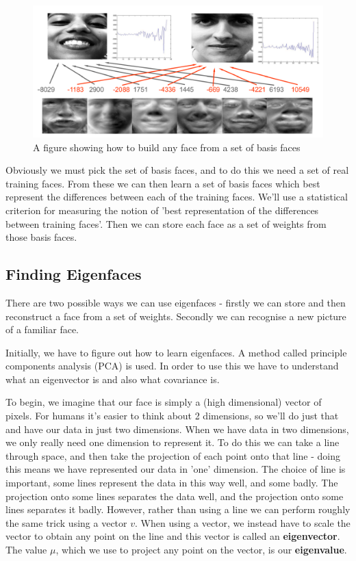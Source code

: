 \documentclass{article}
\begin{document}
	\begin{figure}[h]
		\centering
		\includegraphics[width=\textwidth]{eigenfaces}
		\caption{A figure showing how to build any face from a set of basis faces}
		\label{fig:eigenfaces}
	\end{figure}
	
	Obviously we must pick the set of basis faces, and to do this we need a set of real training faces. From these we can then learn a set of basis faces which best represent the differences between each of the training faces. We'll use a statistical criterion for measuring the notion of 'best representation of the differences between training faces'. Then we can store each face as a set of weights from those basis faces.
	
	\subsection{Finding Eigenfaces}
	There are two possible ways we can use eigenfaces - firstly we can store and then reconstruct a face from a set of weights. Secondly we can recognise a new picture of a familiar face.
	
	Initially, we have to figure out how to learn eigenfaces. A method called principle components analysis (PCA) is used. In order to use this we have to understand what an eigenvector is and also what covariance is.
	
	To begin, we imagine that our face is simply a (high dimensional) vector of pixels. For humans it's easier to think about 2 dimensions, so we'll do just that and have our data in just two dimensions. When we have data in two dimensions, we only really need one dimension to represent it. To do this we can take a line through space, and then take the projection of each point onto that line - doing this means we have represented our data in 'one' dimension. The choice of line is important, some lines represent the data in this way well, and some badly. The projection onto some lines separates the data well, and the projection onto some lines separates it badly. However, rather than using a line we can perform roughly the same trick using a vector $v$. When using a vector, we instead have to scale the vector to obtain any point on the line and this vector is called an \textbf{eigenvector}. The value $\mu$, which we use to project any point on the vector, is our \textbf{eigenvalue}.
	
\end{document}

